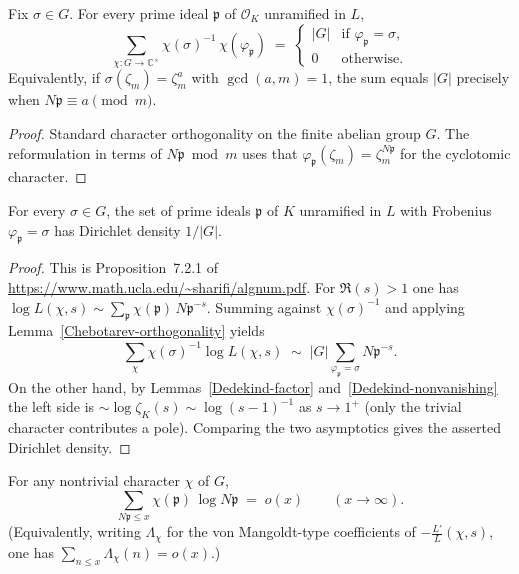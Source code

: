 {\begin{lemma}\label{Chebotarev-orthogonality}
Fix $\sigma \in G$.  For every prime ideal $\mathfrak{p}$ of $\mathcal{O}_K$ unramified in $L$,
\[
\sum_{\chi : G \to \mathbb{C}^\times} \chi(\sigma)^{-1}\,\chi(\varphi_{\mathfrak{p}})
\;=\;
\begin{cases}
|G| & \text{if }\varphi_{\mathfrak{p}} = \sigma,\\
0 & \text{otherwise.}
\end{cases}
\]
Equivalently, if $\sigma(\zeta_m) = \zeta_m^a$ with $\gcd(a,m)=1$, the sum equals $|G|$
precisely when $N\mathfrak{p} \equiv a \pmod{m}$.
\end{lemma}

\begin{proof}
Standard character orthogonality on the finite abelian group $G$.  The reformulation in terms
of $N\mathfrak{p} \bmod m$ uses that $\varphi_{\mathfrak{p}}(\zeta_m) = \zeta_m^{N\mathfrak{p}}$
for the cyclotomic character.
\end{proof}

\begin{proposition}\label{Chebotarev-cyclotomic-density}
For every $\sigma \in G$, the set of prime ideals $\mathfrak{p}$ of $K$ unramified in $L$ with
Frobenius $\varphi_{\mathfrak{p}} = \sigma$ has Dirichlet density $1/|G|$.
\end{proposition}

\begin{proof}
This is Proposition~7.2.1 of \url{https://www.math.ucla.edu/~sharifi/algnum.pdf}.  For
$\Re(s)>1$ one has $\log L(\chi,s) \sim \sum_{\mathfrak{p}} \chi(\mathfrak{p})\, N\mathfrak{p}^{-s}$.
Summing against $\chi(\sigma)^{-1}$ and applying Lemma~\ref{Chebotarev-orthogonality} yields
\[
\sum_{\chi} \chi(\sigma)^{-1} \log L(\chi,s)
\;\sim\;
|G| \sum_{\varphi_{\mathfrak{p}}=\sigma} N\mathfrak{p}^{-s}.
\]
On the other hand, by Lemmas~\ref{Dedekind-factor} and~\ref{Dedekind-nonvanishing} the left
side is $\sim \log\zeta_K(s) \sim \log(s-1)^{-1}$ as $s\to 1^+$ (only the trivial character
contributes a pole).  Comparing the two asymptotics gives the asserted Dirichlet density.
\end{proof}

\begin{lemma}\label{Dedekind-PNT}
For any nontrivial character $\chi$ of $G$,
\[
\sum_{N\mathfrak{p} \leq x} \chi(\mathfrak{p})\, \log N\mathfrak{p} \;=\; o(x)
\qquad(x\to\infty).
\]
(Equivalently, writing $\Lambda_\chi$ for the von Mangoldt-type coefficients of $-\frac{L'}{L}(\chi,s)$,
one has $\sum_{n\leq x} \Lambda_\chi(n) = o(x)$.)
\end{lemma}

}

